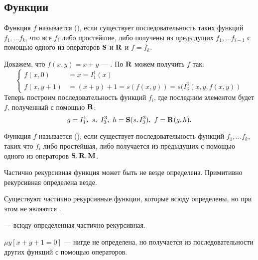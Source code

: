 \subsection{Функции}
\begin{defn}
	Функция $ f$ называется  (\prf),
	если 
	существует последовательность таких функций  $ f_1, \ldots f_k$, что
	все $ f_i$ либо простейшие, либо получены из предыдущих $ f_1, \ldots f_{i-1}$ с помощью одного из операторов $\S$ и $\R$ и $ f = f_k$.
\end{defn}


\begin{ex}\label{ex:1}
	Докажем, что $ f(x, y) = x + y$ --- \prf. По  $ \R$ можем получить $ f$ так:
	\[
	\begin{cases}
		f(x, 0) &= x = I^{1}_{1} (x) \\
		f(x, y+1) &= (x + y) + 1 = s(f(x, y)) = s(I^{3}_{3} (x, y, f(x, y)) 
	\end{cases}
	\] 
	Теперь построим последовательность функций $ f_i$, где последним элементом будет $ f$, полученный с помощью $ \R$: 
	\[
		g = I^{1}_{1} , ~s, ~I^{3}_{3} , ~ h = \S(s, I^{3}_{3}) ,~ f = \R(g, h)
	.\] 
\end{ex}


\begin{defn}
	Функция $ f$ называется  (\crf), если существует последовательность функций $ f_1, \ldots f_k$, таких что $ f_i$ либо простейшая, либо получается из предыдущих с помощью одного из операторов  $ \S, \R, \M$.
\end{defn}

\begin{note}
    Частично рекурсивная функция может быть не везде определена. Примитивно рекурсивная определена везде.
\end{note}
\begin{note}
    Существуют частично рекурсивные функции, которые всюду определены, но при этом не являются \prf.
\end{note}

\begin{defn}
	 --- всюду определенная частично рекурсивная.
\end{defn}


\begin{ex}
	$ \mu y [x + y + 1 = 0]$ --- нигде не определена, но получается из последовательности других функций с помощью операторов.
\end{ex}



